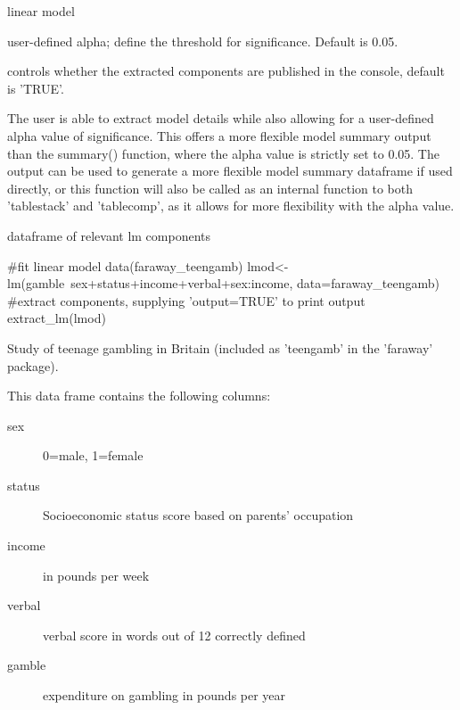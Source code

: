 \documentclass[a4paper]{book}
\begin{document}
%
\begin{Arguments}
\begin{ldescription}
\item[\code{lm}] linear model

\item[\code{alpha}] user-defined alpha; define the threshold for significance. Default is 0.05.

\item[\code{output}] controls whether the extracted components are published in the console, default is 'TRUE'.
\end{ldescription}
\end{Arguments}
%
\begin{Details}
The user is able to extract model details while also allowing for a user-defined alpha value of significance. This offers a more flexible model summary output
than the summary() function, where the alpha value is strictly set to 0.05. The output can be used to generate a more flexible model summary dataframe if used directly,
or this function will also be called as an internal function to both 'tablestack' and 'tablecomp', as it allows for more flexibility with the alpha value.
\end{Details}
%
\begin{Value}
dataframe of relevant lm components
\end{Value}
%
\begin{Examples}
\begin{ExampleCode}
#fit linear model
 data(faraway_teengamb)
 lmod<-lm(gamble~sex+status+income+verbal+sex:income, data=faraway_teengamb)
#extract components, supplying 'output=TRUE' to print output
 extract_lm(lmod)

\end{ExampleCode}
\end{Examples}
%
\begin{Description}
Study of teenage gambling in Britain (included as 'teengamb' in the 'faraway' package).
\end{Description}
%
\begin{Format}
This data frame contains the following columns:
\begin{description}

\item[sex] 0=male, 1=female
\item[status] Socioeconomic status score based on parents' occupation
\item[income] in pounds per week
\item[verbal] verbal score in words out of 12 correctly defined
\item[gamble] expenditure on gambling in pounds per year

\end{description}

\end{Format}
\end{document}
